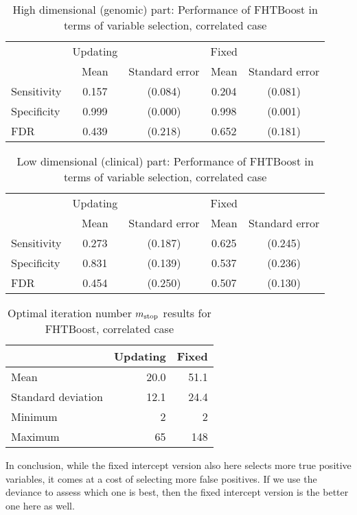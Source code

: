 \begin{table}
\caption{High dimensional (genomic) part: Performance of FHTBoost in terms of variable selection, correlated case}
\label{table:correlated-y0}
\centering
\begin{tabular}{l|cc|cc}
\toprule
& Updating & & Fixed & \\
& Mean & Standard error & Mean & Standard error \\
\hline
Sensitivity & 0.157 & (0.084) & 0.204 & (0.081) \\
Specificity & 0.999 & (0.000) & 0.998 & (0.001) \\
FDR         & 0.439 & (0.218) & 0.652 & (0.181) \\
\bottomrule
\end{tabular}
\end{table}

\begin{table}
\caption{Low dimensional (clinical) part: Performance of FHTBoost in terms of variable selection, correlated case}
\label{table:correlated-mu}
\centering
\begin{tabular}{l|cc|cc}
\toprule
& Updating & & Fixed & \\
& Mean & Standard error & Mean & Standard error \\
\hline
Sensitivity & 0.273 & (0.187) & 0.625 & (0.245) \\
Specificity & 0.831 & (0.139) & 0.537 & (0.236) \\
FDR         & 0.454 & (0.250) & 0.507 & (0.130) \\
\bottomrule
\end{tabular}
\end{table}

\begin{table}
\caption{Optimal iteration number $m_{\text{stop}}$ results for FHTBoost, correlated case}
\label{table:correlated-mstop}
\centering
\begin{tabular}{l|rr}
\toprule
& Updating & Fixed \\
\hline
Mean               &  20.0  &  51.1  \\
Standard deviation &  12.1  &  24.4  \\
Minimum            &     2  &     2  \\
Maximum            &    65  &   148  \\
\bottomrule
\end{tabular}
\end{table}

In conclusion, while the fixed intercept version also here selects more true positive variables, it comes at a cost of selecting more false positives.
If we use the deviance to assess which one is best, then the fixed intercept version is the better one here as well.

